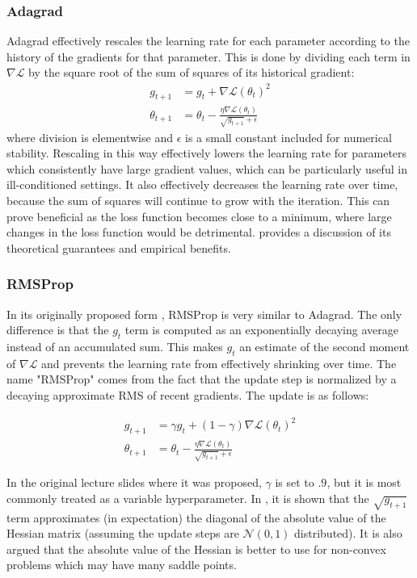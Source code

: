 \subsubsection{Adagrad}

Adagrad \cite{} effectively rescales the learning rate for each parameter according to the history of the gradients for that parameter.
This is done by dividing each term in $\nabla \mathcal{L}$ by the square root of the sum of squares of its historical gradient:
\begin{align}
g_{t + 1} &= g_t + \nabla \mathcal{L}(\theta_t)^2 \\
\theta_{t + 1} &= \theta_t - \frac{\eta\nabla \mathcal{L}(\theta_t)}{\sqrt{g_{t + 1}} + \epsilon}
\end{align}
where division is elementwise and $\epsilon$ is a small constant included for numerical stability.
Rescaling in this way effectively lowers the learning rate for parameters which consistently have large gradient values, which can be particularly useful in ill-conditioned settings.
It also effectively decreases the learning rate over time, because the sum of squares will continue to grow with the iteration.
This can prove beneficial as the loss function becomes close to a minimum, where large changes in the loss function would be detrimental.
\cite{} provides a discussion of its theoretical guarantees and empirical benefits.

\subsubsection{RMSProp}

In its originally proposed form \cite{}, RMSProp is very similar to Adagrad.
The only difference is that the $g_t$ term is computed as an exponentially decaying average instead of an accumulated sum.
This makes $g_t$ an estimate of the second moment of $\nabla \mathcal{L}$ and prevents the learning rate from effectively shrinking over time.
The name "RMSProp" comes from the fact that the update step is normalized by a decaying approximate RMS of recent gradients.
The update is as follows:

\begin{align}
g_{t + 1} &= \gamma g_t + (1 - \gamma) \nabla \mathcal{L}(\theta_t)^2 \\
\theta_{t + 1} &= \theta_t - \frac{\eta\nabla \mathcal{L}(\theta_t)}{\sqrt{g_{t + 1}} + \epsilon}
\end{align}

In the original lecture slides where it was proposed, $\gamma$ is set to $.9$, but it is most commonly treated as a variable hyperparameter.
In \cite{}, it is shown that the $\sqrt{g_{t + 1}}$ term approximates (in expectation) the diagonal of the absolute value of the Hessian matrix (assuming the update steps are $\mathcal{N}(0, 1)$ distributed).
It is also argued that the absolute value of the Hessian is better to use for non-convex problems which may have many saddle points.

